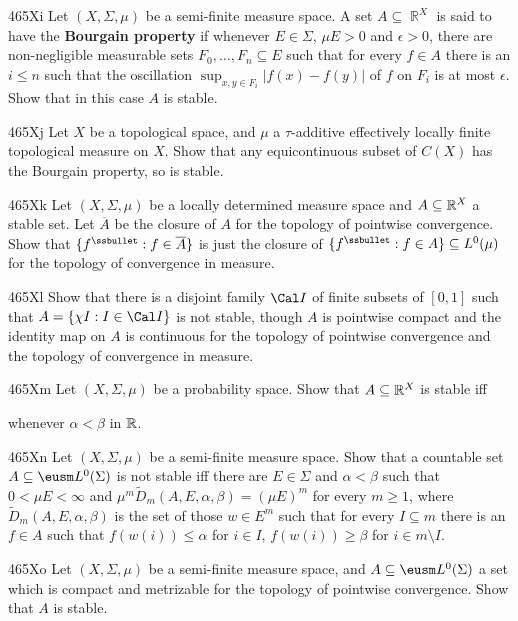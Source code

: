 {\spheader 465Xi Let $(X,\Sigma,\mu)$ be a
semi-finite measure space.   A set
$A\subseteq\BbbR^X$ is said to have the {\bf Bourgain property} if whenever
$E\in\Sigma$, $\mu E>0$ and $\epsilon>0$, there are
non-negligible measurable sets $F_0,\ldots,F_n\subseteq E$ such that for
every $f\in A$ there is an $i\le n$ such that the oscillation
$\sup_{x,y\in F_i}|f(x)-f(y)|$ of $f$ on $F_i$ is at most $\epsilon$.
Show that in this case $A$ is stable.

\spheader 465Xj Let $X$ be a topological space, and $\mu$ a
$\tau$-additive effectively locally finite topological measure on $X$.
Show that any equicontinuous subset of $C(X)$ has the Bourgain property, so
is stable.

\spheader 465Xk Let $(X,\Sigma,\mu)$ be a locally determined measure
space and
$A\subseteq\Bbb R^X$ a stable set.   Let $\overline{A}$ be the closure
of $A$ for the topology of pointwise convergence.    Show that
$\{f^{\ssbullet}:f\in\overline{A}\}$ is just the closure of
$\{f^{\ssbullet}:f\in A\}\subseteq L^0(\mu)$ for the topology of
convergence in measure.

\spheader 465Xl Show that there is a disjoint family $\Cal I$ of finite
subsets of $[0,1]$ such that $A=\{\chi I:I\in\Cal I\}$ is not stable,
though $A$ is pointwise compact and the identity map on $A$ is
continuous for the topology of pointwise convergence and the topology of
convergence in measure.

\spheader 465Xm Let $(X,\Sigma,\mu)$ be a probability space.   Show that
$A\subseteq\Bbb R^X$ is stable iff


\noindent whenever $\alpha<\beta$ in $\Bbb R$.

\spheader 465Xn Let $(X,\Sigma,\mu)$ be a
semi-finite measure space.   Show that a
countable set $A\subseteq\eusm L^0(\Sigma)$ is not stable iff there are
$E\in\Sigma$ and $\alpha<\beta$ such that $0<\mu E<\infty$ and
$\mu^m\tilde D_m(A,E,\alpha,\beta)=(\mu E)^m$ for every $m\ge 1$, where
$\tilde D_m(A,E,\alpha,\beta)$ is the set of those $w\in E^m$ such that
for every $I\subseteq m$ there is an $f\in A$ such that
$f(w(i))\le\alpha$
for $i\in I$, $f(w(i))\ge\beta$ for $i\in m\setminus I$.   

\spheader 465Xo Let $(X,\Sigma,\mu)$ be a semi-finite measure space, and
$A\subseteq\eusm L^0(\Sigma)$ a set which is compact and metrizable for
the topology of pointwise convergence.   Show that $A$ is stable.

}
